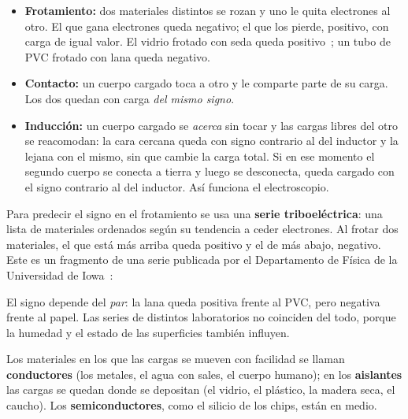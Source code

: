 \documentclass[11pt]{article}
\begin{document}
\begin{itemize}
  \item \textbf{Frotamiento:} dos materiales distintos se rozan y uno le quita
        electrones al otro. El que gana electrones queda negativo; el que los
        pierde, positivo, con carga de igual valor. El vidrio frotado con seda
        queda positivo~\cite{openstax}; un tubo de PVC frotado con lana queda
        negativo.
  \item \textbf{Contacto:} un cuerpo cargado toca a otro y le comparte parte de
        su carga. Los dos quedan con carga \emph{del mismo signo}.
  \item \textbf{Inducción:} un cuerpo cargado se \emph{acerca} sin tocar y las
        cargas libres del otro se reacomodan: la cara cercana queda con signo
        contrario al del inductor y la lejana con el mismo, sin que cambie la
        carga total. Si en ese momento el segundo cuerpo se conecta a tierra y
        luego se desconecta, queda cargado con el signo contrario al del
        inductor. Así funciona el electroscopio.
\end{itemize}

Para predecir el signo en el frotamiento se usa una \textbf{serie
triboeléctrica}: una lista de materiales ordenados según su tendencia a ceder
electrones. Al frotar dos materiales, el que está más arriba queda positivo y
el de más abajo, negativo. Este es un fragmento de una serie publicada por el
Departamento de Física de la Universidad de Iowa~\cite{uiowa}:

\begin{center}
\end{center}

El signo depende del \emph{par}: la lana queda positiva frente al PVC, pero
negativa frente al papel. Las series de distintos laboratorios no coinciden
del todo, porque la humedad y el estado de las superficies también influyen.

Los materiales en los que las cargas se mueven con facilidad se llaman
\textbf{conductores} (los metales, el agua con sales, el cuerpo humano); en los
\textbf{aislantes} las cargas se quedan donde se depositan (el vidrio, el
plástico, la madera seca, el caucho). Los \textbf{semiconductores}, como el
silicio de los chips, están en medio.
\end{document}

